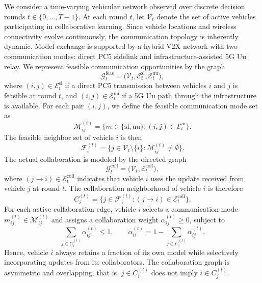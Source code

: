 We consider a time-varying vehicular network observed over discrete decision rounds $t \in \{0,\dots,T-1\}$. At each round $t$, let $\mathcal{V}_t$ denote the set of active vehicles participating in collaborative learning. Since vehicle locations and wireless connectivity evolve continuously, the communication topology is inherently dynamic. Model exchange is supported by a hybrid V2X network with two communication modes: direct PC5 sidelink and infrastructure-assisted 5G Uu relay. We represent feasible communication opportunities by the graph
%
\begin{equation*}
    \mathcal{G}_t^{\mathrm{feas}} = \bigl(\mathcal{V}_t,\mathcal{E}_t^{\mathrm{sl}},\mathcal{E}_t^{\mathrm{uu}}\bigr),
\end{equation*}
%
where $(i,j)\in\mathcal{E}_t^{\mathrm{sl}}$ if a direct PC5 transmission between vehicles $i$ and $j$ is feasible at round $t$, and $(i,j)\in\mathcal{E}_t^{\mathrm{uu}}$ if a 5G Uu path through the infrastructure is available. For each pair $(i,j)$, we define the feasible communication mode set as
%
\begin{equation*}
    \mathcal{M}_{ij}^{(t)} = \{m\in\{\mathrm{sl},\mathrm{uu}\}:(i,j)\in\mathcal{E}_t^{m}\}.
\end{equation*}
%
The feasible neighbor set of vehicle $i$ is then
\begin{equation*}
    \mathcal{F}_i^{(t)} = \{j\in\mathcal{V}_t\setminus\{i\}:\mathcal{M}_{ij}^{(t)}\neq\emptyset\}.
\end{equation*}
%
The actual collaboration is modeled by the directed graph
%
\begin{equation*}
    \mathcal{G}_t^{\mathrm{coll}} = \bigl(\mathcal{V}_t,\mathcal{E}_t^{\mathrm{coll}}\bigr),
\end{equation*}
%
where $(j\!\to\! i)\in\mathcal{E}_t^{\mathrm{coll}}$ indicates that vehicle $i$ uses the update received from vehicle $j$ at round $t$. The collaboration neighborhood of vehicle $i$ is therefore
%
\begin{equation*}
    C_i^{(t)} = \{j\in\mathcal{F}_i^{(t)}:(j\!\to\! i)\in\mathcal{E}_t^{\mathrm{coll}}\}.
\end{equation*}
%
For each active collaboration edge, vehicle $i$ selects a communication mode $m_{ij}^{(t)}\in\mathcal{M}_{ij}^{(t)}$ and assigns a collaboration weight $\alpha_{ij}^{(t)}\geq 0$, subject to
%
\begin{equation*}
    \sum_{j\in C_i^{(t)}} \alpha_{ij}^{(t)} \leq 1,
    \qquad
    \alpha_{ii}^{(t)} = 1 - \sum_{j\in C_i^{(t)}} \alpha_{ij}^{(t)}.
\end{equation*}
%
Hence, vehicle $i$ always retains a fraction of its own model while selectively incorporating updates from its collaborators. The collaboration graph is asymmetric and overlapping, that is, $j\in C_i^{(t)}$ does not imply $i\in C_j^{(t)}$.


